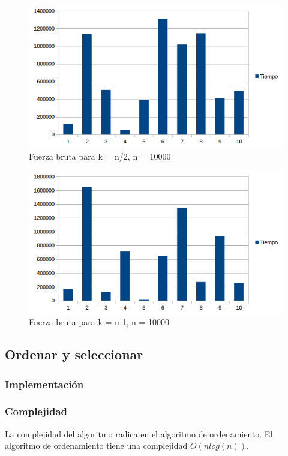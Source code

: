 \begin{figure}[H]
\centering
\includegraphics[width=\textwidth]{KN2/BruteForceN2.png}
\caption{Fuerza bruta para k = n/2, n = 10000}
\end{figure}

\begin{figure}[H]
\centering
\includegraphics[width=\textwidth]{KN/BruteForceN.png}
\caption{Fuerza bruta para k = n-1, n = 10000}
\end{figure}

\newpage
\subsection{Ordenar y seleccionar}
\subsubsection{Implementación}

\subsubsection{Complejidad}
La complejidad del algoritmo radica en el algoritmo de ordenamiento. El algoritmo de ordenamiento tiene una complejidad $O(n log(n))$\cite{STD_SORT}.

